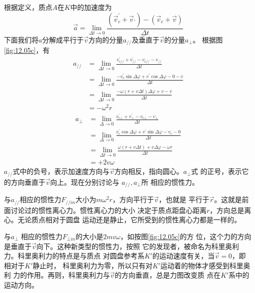 根据定义，质点$ A $在$ K $中的加速度为
\begin{equation*}
    \vec{a} = \lim _ { \Delta t \to 0 } \frac { ( \vec{v} _ { c } ^ { \prime } + \vec{v} _ { \prime } ) - ( \vec{v} _ { c } + \vec{v} ) } { \Delta t }
\end{equation*}
下面我们将$ a $分解成平行于$\vec{v}$方向的分量$ a _ {//} $及垂直于$\vec{v}$的分量$ a _ \bot $。
根据图\ref{fig:12.05c}，有\\
\begin{equation}\label{eqn:12.02.04}
        \begin{aligned}
    a _ { // } &= \lim_{ \Delta t \to 0 } \frac { v _ { c// } ^ { \prime } + v _ { // } ^ { \prime } - v _ { c// } - v _ { // } } { \Delta t } \\
       &=\lim _{\Delta t \to 0} \frac{-v_{c}^{\prime} \sin \Delta \varphi+v^{\prime} \cos \Delta \varphi-0-v}{\Delta t} \\
        &=\lim _{\Delta t \to 0} \frac{-\omega(r+v \Delta t) \Delta \varphi+v-v}{\Delta t} \\
        &=-\omega^{2} r
    \end{aligned}
\end{equation}
\begin{equation}\label{eqn:12.02.05}
    \begin{aligned}
        a_{\bot} &=\lim _{\Delta \rightarrow 0} \frac{v_{c \bot}^{\prime}+v_{\bot}^{\prime}-v_{c \bot}-v_{\bot}}{\Delta t} \\
        &=\lim _{\Delta \rightarrow 0} \frac{v_{c}^{\prime} \cos \Delta \varphi+v^{\prime} \sin \Delta \varphi-v_{c}-0}{\Delta t} \\
        &=\lim _{\Delta t \rightarrow 0} \frac{\omega(r+v \Delta t)+v \Delta \varphi-\omega r}{\Delta t} \\
        &=+2 v \omega
    \end{aligned}
\end{equation}
$ a_{//} $式中的负号，表示加速度方向与$\vec{v}$方向相反，指向圆心。$ a_{\bot} $式
的正号，表示它的方向垂直于$\vec{v}$向上。现在分别讨论与 $ a_{//}, a_{\bot}$所
相应的惯性力。

与$ a_{//} $相应的惯性力$ F_{//in} $大小为$ m\omega ^ 2 r $，方向平行于$\vec{v}$，也就是
平行于$\vec{r}$。这就是前面讨论过的惯性离心力。惯性离心力的大小
决定于质点距盘心距离$ r $，方向总是离心。无论质点相对于圆盘
运动还是静止，它所受到的惯性离心力都是一样的。

与$ a _ { \bot } $ 相应的惯性力$ F_{\bot in} $的大小是$ 2mv\omega $，如按图\ref{fig:12.05c}的方
位，这个力的方向是垂直于$\vec{v}$向下。这种新类型的惯性力，按照
它的发现者，被命名为科里奥利力。科里奥利力的特点是与质点
对圆盘参考系$ K' $的运动速度有关，当$  \vec{v} = 0   $，即相对于$ K' $静止时，
科里奥利力为零，所以只有对$ K' $运动着的物体才感受到科里奥利
力的作用。再则，科里奥利力与$\vec{v}$的方向垂直，总是力图改变质
点在$ K' $系中的运动方向。

